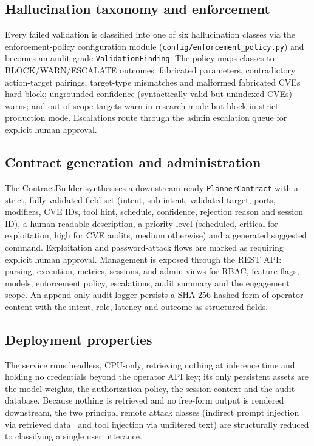 \subsection*{Hallucination taxonomy and enforcement}

Every failed validation is classified into one of six hallucination classes via
the enforcement-policy configuration module
(\texttt{config/enforcement\_policy.py}) and becomes an audit-grade
\texttt{ValidationFinding}. The policy maps classes to
BLOCK/WARN/ESCALATE outcomes: fabricated parameters, contradictory
action-target pairings, target-type mismatches and malformed fabricated CVEs
hard-block; ungrounded confidence (syntactically valid but unindexed CVEs)
warns; and out-of-scope targets warn in research mode but block in strict
production mode. Escalations route through the admin escalation queue for
explicit human approval.

\subsection*{Contract generation and administration}\label{sec:contract-generation}

The ContractBuilder synthesises a downstream-ready \texttt{PlannerContract}
with a strict, fully validated field set (intent, sub-intent, validated target,
ports, modifiers, CVE IDs, tool hint, schedule, confidence, rejection reason
and session ID), a human-readable description, a priority level (scheduled,
critical for exploitation, high for CVE audits, medium otherwise) and a
generated suggested command. Exploitation and password-attack flows are marked
as requiring explicit human approval. Management is exposed through the REST
API: parsing, execution, metrics, sessions, and admin views for RBAC, feature
flags, models, enforcement policy, escalations, audit summary and the
engagement scope. An append-only audit logger persists a SHA-256 hashed form
of operator content with the intent, role, latency and outcome as structured
fields.

\subsection*{Deployment properties}\label{sec:deployment-properties}

The service runs headless, CPU-only, retrieving nothing at inference time and
holding no credentials beyond the operator API key; its only persistent assets
are the model weights, the authorization policy, the session context and the
audit database. Because nothing is retrieved and no free-form output is
rendered downstream, the two principal remote attack classes (indirect prompt
injection via retrieved data~\cite{greshake2023indirect} and tool injection via
unfiltered text) are structurally reduced to classifying a single user
utterance.

